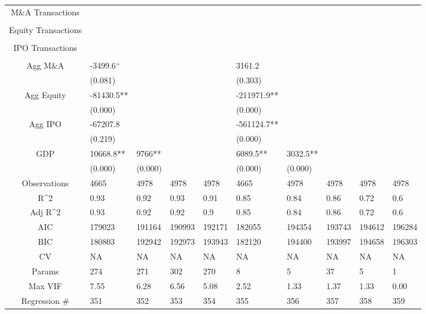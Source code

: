 \documentclass{article}
\begin{document}
\begin{table}[H]
\begin{tabular}{|clllllllll|}
  M\&A Transactions &  &  &  &  &  &  &  &  &  \\ 
   &  &  &  &  &  &  &  &  &  \\ 
  Equity Transactions &  &  &  &  &  &  &  &  &  \\ 
   &  &  &  &  &  &  &  &  &  \\ 
  IPO Transactions &  &  &  &  &  &  &  &  &  \\ 
   &  &  &  &  &  &  &  &  &  \\ 
  Agg M\&A & -3499.6$^{+}$ &  &  &  & 3161.2 &  &  &  &  \\ 
   & (0.081) &  &  &  & (0.303) &  &  &  &  \\ 
  Agg Equity & -81430.5** &  &  &  & -211971.9** &  &  &  &  \\ 
   & (0.000) &  &  &  & (0.000) &  &  &  &  \\ 
  Agg IPO & -67207.8 &  &  &  & -561124.7** &  &  &  &  \\ 
   & (0.219) &  &  &  & (0.000) &  &  &  &  \\ 
  GDP & 10668.8** & 9766** &  &  & 6089.5** & 3032.5** &  &  &  \\ 
   & (0.000) & (0.000) &  &  & (0.000) & (0.000) &  &  &  \\ 
  \hline 
 Observations & 4665 & 4978 & 4978 & 4978 & 4665 & 4978 & 4978 & 4978 & 4978 \\ 
  R^2 & 0.93 & 0.92 & 0.93 & 0.91 & 0.85 & 0.84 & 0.86 & 0.72 & 0.6 \\ 
  Adj R^2 & 0.93 & 0.92 & 0.92 & 0.9 & 0.85 & 0.84 & 0.86 & 0.72 & 0.6 \\ 
  AIC & 179023 & 191164 & 190993 & 192171 & 182055 & 194354 & 193743 & 194612 & 196284 \\ 
  BIC & 180803 & 192942 & 192973 & 193943 & 182120 & 194400 & 193997 & 194658 & 196303 \\ 
  CV & NA & NA & NA & NA & NA & NA & NA & NA & NA \\ 
  Params & 274 & 271 & 302 & 270 & 8 & 5 & 37 & 5 & 1 \\ 
  Max VIF & 7.55 & 6.28 & 6.56 & 5.08 & 2.52 & 1.33 & 1.37 & 1.33 & 0.00 \\ 
  Regression \# & 351 & 352 & 353 & 354 & 355 & 356 & 357 & 358 & 359 \\ 
   \hline
\end{tabular}
 
\end{table}
\end{document}
